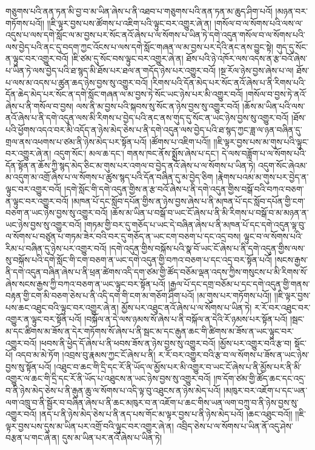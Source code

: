 གཅུགས་པའི་ནན་ཏན་མི་བྱ་བ་མ་ཡིན་ཞེས་པ་ནི་འཐབ་པ་གཅུགས་པའི་ནན་ཏན་མ་ཆུད་ཤིག་པའོ། །མཉན་བར་གཏོགས་པའོ།། །།ཇི་ལྟར་བྱས་པས་ཚོགས་པ་འཇིག་པའི་ལྟུང་བར་འགྱུར་ཞེ་ན། །གསོལ་བ་ལ་སོགས་པའི་ལས་ལ་འདུས་པ་ལས་དགེ་སློང་ལ་མ་བྱས་པར་སོང་ནའོ་ཞེས་པ་ལ་སོགས་པ་ཡིན་ཏེ་དགེ་འདུན་གསོལ་བ་ལ་སོགས་པའི་ལས་བྱེད་པའི་ནང་དུ་བདག་ཀྱང་འོངས་པ་ལས་དགེ་སློང་གཞན་ལ་མ་བྱས་པར་དེའི་ནང་ནས་བྱུང་སྟེ། གུད་དུ་སོང་ན་ལྟུང་བར་འགྱུར་བའོ། །ཇི་ཙམ་དུ་སོང་བས་ལྟུང་བར་འགྱུར་ཞེ་ན། ཐོས་པའི་ཉེ་འཁོར་ལས་འདས་ན་རྩ་བའོ་ཞེས་པ་ཡིན་ཏེ་ལས་བྱེད་པའི་ཐ་སྙད་མི་ཐོས་པར་ཐལ་ན་གདོད་ཉེས་པར་འགྱུར་བའོ། །སྔ་རོལ་ཉེས་བྱས་ཞེས་པ་ལ། ཐོས་པ་ལས་མ་འདས་པ་ཚུན་ཆད་ཉེས་བྱས་སུ་འགྱུར་བའོ། །རིགས་པའི་དོན་མེད་པར་སོང་ནའོ་ཞེས་པ་ནི་རིགས་པའི་དོན་ཆེད་མེད་པར་སོང་ན་དགེ་སློང་གཞན་ལ་མ་བྱས་ཏེ་སོང་ཡང་ཉེས་པར་མི་འགྱུར་བའོ། །གསོལ་བ་བྱས་ཏེ་ནའོ་ཞེས་པ་ནི་གསོལ་བ་བྱས། ལས་ནི་མ་བྱས་པའི་སྐབས་སུ་སོང་ན་ཉེས་བྱས་སུ་འགྱུར་བའོ། །ཆོས་མ་ཡིན་པའི་ལས་ནའོ་ཞེས་པ་ནི་དགེ་འདུན་ལས་མི་རིགས་པ་བྱེད་པའི་ནང་ནས་གུད་དུ་སོང་ན་ཡང་ཉེས་བྱས་སུ་འགྱུར་བའོ། །ཐོས་པའི་ཕྱོགས་འདའ་བར་མི་འདོད་ན་ཉེས་མེད་ཅེས་པ་ནི་དགེ་འདུན་ལས་བྱེད་པའི་ཐ་སྙད་ཀྱང་ཟླ་ལ་ཉན་བཞིན་དུ་གྲལ་ནས་འཕགས་པ་ཙམ་ནི་ཉེས་མེད་པར་སྟོན་པའོ། །ཚོགས་པ་འཇིག་པའོ།། །།ཇི་ལྟར་བྱས་པས་མ་གུས་པའི་ལྟུང་བར་འགྱུར་ཞེ་ན། འདུག་སོང་། མལ་ཆ་དང་། གནས་ཁང་ནོས་སྨྲོས་ཞེས་པ་དང་། དེ་ལས་བཟློག་པ་ལ་སོགས་པའི་དོན་སྟོན་ན་ཆོས་ཀྱི་སྙད་མེད་ཅིང་མ་གུས་པར་འགལ་བ་བྱེད་ནའོ་ཞེས་པ་ལ་སོགས་པ་ཡིན་ཏེ། འདུག་སོང་ཞེའམ་མ་འདུག་མ་འགྲོ་ཞེས་པ་ལ་སོགས་པ་ཚུས་སྙད་པའི་དོན་བཞིན་དུ་མ་བྱེད་ཅིག །རྣེགས་པའམ་མ་གུས་པར་བྱེད་ན་ལྟུང་བར་འགྱུར་བའོ། །དགེ་སློང་གི་དགེ་འདུན་གྱིས་ན་རྩ་བའོ་ཞེས་པ་ནི་དགེ་འདུན་གྱིས་བསྒོ་བའི་བཀའ་བཅག་ན་ལྟུང་བར་འགྱུར་བའོ། །མཁན་པོ་དང་སློབ་དཔོན་གྱིས་ན་ཉེས་བྱས་ཞེས་པ་ནི་མཁན་པོ་དང་སློབ་དཔོན་གྱི་ངག་བཅག་ན་ཡང་ཉེས་བྱས་སུ་འགྱུར་བའོ། །ཆོས་མ་ཡིན་པ་བསྒོ་བ་ཡང་ངོ་ཞེས་པ་ནི་མི་རིགས་པ་བསྒོ་བ་མ་མཉན་ན་ཡང་ཉེས་བྱས་སུ་འགྱུར་བའོ། །གཏམ་གྱི་བར་དུ་གཅོད་པ་ཡང་དེ་བཞིན་ཞེས་པ་ནི་མཁན་པོ་དང་དགེ་འདུན་ལྟ་བུ་ལ་སོགས་པ་བཙུན་པ་གཏམ་ཟེར་བའི་བར་དུ་གཅོད་ན་ཡང་ངག་བཅག་པ་དང་འདྲ་བས། ལྟུང་བ་ལ་སོགས་པའི་རིམ་པ་བཞིན་དུ་ཉེས་པར་འགྱུར་བའོ། །དགེ་འདུན་གྱིས་བསྐོས་པའི་སྣ་བོ་ཡང་ངོ་ཞེས་པ་ནི་དགེ་འདུན་གྱིས་ལས་སུ་བསྐོས་པའི་དགེ་སློང་གི་ངག་བཅག་ན་ཡང་དགེ་འདུན་གྱི་བཀའ་བཅག་པ་དང་འདྲ་བར་སྟོན་པའོ། །སངས་རྒྱས་ནི་དགེ་འདུན་བཞིན་ཞེས་པ་ནི་ཕྲན་ཚེགས་འདི་དག་ཙམ་གྱི་ཚོད་བཅོམ་ལྡན་འདས་ཀྱིས་གསུངས་པ་མི་རིགས་སོ་ཞེས་སངས་རྒྱས་ཀྱི་བཀའ་བཅག་ན་ཡང་ལྟུང་བར་སྟོན་པའོ། །རྒྱལ་པོ་དང་དགྲ་བཅོམ་པ་དང་དགེ་འདུན་གྱི་གནས་བརྟན་གྱི་ངག་མི་བཅག་ཅེས་པ་ནི་འདི་དག་གི་ངག་མ་གཅོག་ཤིག་པའོ། །མ་གུས་པར་གཏོགས་པའོ།། །།ཇི་ལྟར་བྱས་པས་ཆང་འཐུང་བའི་ལྟུང་བར་འགྱུར་ཞེ་ན། མྱོས་པར་འཐུང་ནའོ་ཞེས་པ་ལ་སོགས་པ་ཡིན་ཏེ། ར་རོ་བར་འཐུང་བར་འགྱུར་ན་ལྟུང་བར་སྟོན་པའོ། །བསྐོལ་ན་དེ་ལས་ཉམས་སོ་ཞེས་པ་ནི་བསྐོལ་ན་དེའི་རོ་ཉམས་པར་སྟོན་པའོ། །སྦང་མ་དང་ཚིགས་མ་ཟོས་ན་དེར་གཏོགས་སོ་ཞེས་པ་ནི་སྦང་མ་དང་རྒུན་ཆང་གི་ཚིགས་མ་ཟོས་ན་ཡང་ལྟུང་བར་འགྱུར་བའོ། །ཕབས་ནི་ཕྱེད་དོ་ཞེས་པ་ནི་ཕབས་ཟོས་ན་ཉེས་བྱས་སུ་འགྱུར་བའོ། །མྱོས་པར་འགྱུར་བའི་རྩ་བ། སྡོང་པོ། འདབ་མ་མེ་ཏོག །འབྲས་བུ་རྣམས་ཀྱང་ངོ་ཞེས་པ་ནི། ར་རོ་བར་འགྱུར་བའི་རྩ་བ་ལ་སོགས་པ་ཟོས་ན་ཡང་ཉེས་བྱས་སུ་སྟོན་པའོ། །འཐུང་བ་ཆང་གི་དྲི་དང་རོ་ནི་ཡོད་ལ་མྱོས་པར་མི་འགྱུར་བ་ཡང་ངོ་ཞེས་པ་ནི་མྱོས་པར་ནི་མི་འགྱུར་ལ་ཆང་གི་དྲི་དང་རོ་ནི་ཡོད་པ་འཐུངས་ན་ཡང་ཉེས་བྱས་སུ་འགྱུར་བའོ། །ཁ་དོག་ཙམ་གྱི་ཚོད་ཆང་དང་འདྲ་བ་ནི་ཉེས་མེད་ཅེས་པ་ནི་རྒུན་ཆུ་ལ་སོགས་པ་འདི་ལྟ་བུ་འཐུངས་ན་ཉེས་མེད་པའོ། །མཁུར་བར་འཇོག་པ་དང་ཡན་ལག་འཁྲུ་བ་ནི་སྦྱོར་བ་བཞིན་ཞེས་པ་ནི་ཆང་མཁུར་བ་ན་འཇོག་པ་ཆང་གིས་ཡན་ལག་བཀྲུ་བ་ནི་ཉེས་བྱས་སུ་འགྱུར་བའོ། །ནད་པ་ནི་ཉེས་མེད་ཅེས་པ་ནི་ནད་པས་གོང་མ་ལྟར་བྱས་པ་ནི་ཉེས་མེད་པའོ། །ཆང་འཐུང་བའོ།། །།ཇི་ལྟར་བྱས་པས་དུས་མ་ཡིན་པར་འགྲོ་བའི་ལྟུང་བར་འགྱུར་ཞེ་ན། འབྲིད་ཅེས་པ་ལ་སོགས་པ་ཡིན་ནོ་འདུ་ཤེས་བརྩན་པ་གང་ཞེ་ན། དུས་མ་ཡིན་པར་ནའོ་ཞེས་པ་ཡིན་ཏེ། 